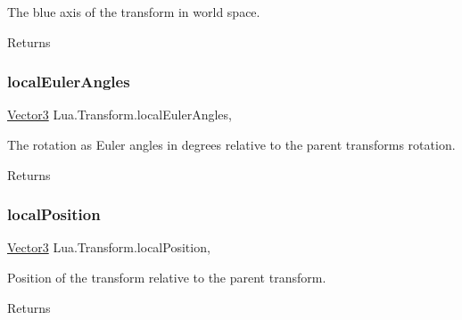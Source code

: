The blue axis of the transform in world space. 

\begin{DoxyReturn}{Returns}

\end{DoxyReturn}
\mbox{\label{class_lua_1_1_transform_a7923f3c584b87b8e56de6b32acbfba99}} 
\subsubsection{\texorpdfstring{localEulerAngles}{localEulerAngles}}
{\footnotesize\ttfamily \mbox{\hyperlink{class_lua_1_1_vector3}{Vector3}} Lua.\+Transform.\+local\+Euler\+Angles\hspace{0.3cm}{\ttfamily [get]}, {\ttfamily [set]}}



The rotation as Euler angles in degrees relative to the parent transform\textquotesingle{}s rotation. 

\begin{DoxyReturn}{Returns}

\end{DoxyReturn}
\mbox{\label{class_lua_1_1_transform_ab081c482002c1e4fedbcfa090b19b90e}} 
\subsubsection{\texorpdfstring{localPosition}{localPosition}}
{\footnotesize\ttfamily \mbox{\hyperlink{class_lua_1_1_vector3}{Vector3}} Lua.\+Transform.\+local\+Position\hspace{0.3cm}{\ttfamily [get]}, {\ttfamily [set]}}



Position of the transform relative to the parent transform. 

\begin{DoxyReturn}{Returns}

\end{DoxyReturn}
\mbox{\label{class_lua_1_1_transform_a2397fd50baf04311df6a50e4dcc302bd}} 
